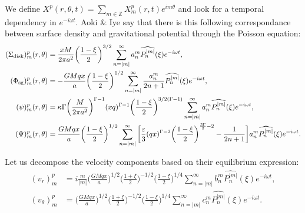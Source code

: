 \documentclass[11pt]{article}
\newcommand{\vr}{v_{r}}
\newcommand{\vt}{v_{\theta}}
\newcommand{\Sigmad}{\Sigma_{\rm{disk}}}
\newcommand{\Phisg}{\Phi_{\rm{sg}}}
\newcommand{\anm}{a_n^m}
\newcommand{\bnm}{b_n^m}
\newcommand{\cnm}{c_n^m}
\newcommand{\Pnm}{P_n^{|m|}}
\newcommand{\hPnm}{\widehat{\Pnm}}
\begin{document}
We define $X^p(r,\theta,t) = \sum_{m\in \mathbb{Z}} X_m^p(r,t) e^{i m \theta}$ and look for a temporal dependency in $e^{-i \omega t}$.
Aoki \& Iye say that there is this following correspondance between surface density and gravitational potential through the Poisson equation:
\begin{align}
(\Sigmad)_m^p (r,\theta) &= \frac{xM}{2\pi a^2} \bigg(\frac{1-\xi}{2}\bigg)^{3/2} \sum_{n=|m|}^{\infty} \anm \hPnm(\xi) e^{-i \omega t} ,\\
(\Phisg)_m^p (r,\theta) &= -\frac{GMqx}{a} \bigg(\frac{1-\xi}{2}\bigg)^{1/2} \sum_{n=|m|}^{\infty} \frac{\anm}{2n+1} \hPnm(\xi) e^{-i \omega t} ,\\
(\psi)_m^p (r,\theta) &= \kappa \Gamma \bigg(\frac{M}{2\pi a^2} \bigg)^{\Gamma-1} (xq)^{\Gamma-1} \bigg(\frac{1-\xi}{2}\bigg)^{3/2(\Gamma-1)} \sum_{n=|m|}^{\infty} \anm \hPnm(\xi) e^{-i \omega t} ,\\
(\Psi)_m^p (r,\theta) &= \frac{GMqx}{a } \bigg(\frac{1-\xi}{2}\bigg)^{1/2}\sum_{n=|m|}^{\infty} \bigg[\frac{\varepsilon}{3} (qx)^{\Gamma-2} \bigg(\frac{1-\xi}{2}\bigg)^{\frac{3\Gamma}{2}-2}  -\frac{1}{2n+1}  \bigg]\anm \hPnm(\xi)e^{-i \omega t} .
\end{align}

Let us decompose the velocity components based on their equilibrium expression:
\begin{align}
(\vr)_m^p &= i \frac{m}{|m|} \bigg(\frac{GMqx}{a}\bigg)^{1/2} \bigg(\frac{1+\xi}{2}\bigg)^{-1/2} \bigg(\frac{1-\xi}{2}\bigg)^{1/4} \sum_{n=|m|}^{\infty} \bnm \hPnm(\xi) e^{-i \omega t} ,\\
(\vt)_m^p &=\bigg(\frac{GMqx}{a}\bigg)^{1/2} \bigg(\frac{1+\xi}{2}\bigg)^{-1/2} \bigg(\frac{1-\xi}{2}\bigg)^{1/4} \sum_{n=|m|}^{\infty} \cnm \hPnm(\xi) e^{-i \omega t} .
\end{align}
\end{document}
